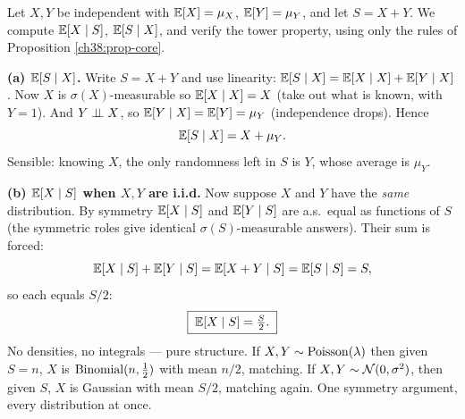 \begin{example}
\label{ch38:ex-sum}
Let $X, Y$ be independent with $\operatorname{\mathbb{E}}[X] = \mu_X$, $\operatorname{\mathbb{E}}[Y] = \mu_Y$, and let $S = X + Y$. We compute
$\operatorname{\mathbb{E}}[X \mid S]$, $\operatorname{\mathbb{E}}[S \mid X]$, and verify the tower property, using only the rules of
Proposition \ref{ch38:prop-core}.

\textbf{(a) $\operatorname{\mathbb{E}}[S\mid X]$.} Write $S = X + Y$ and use linearity: $\operatorname{\mathbb{E}}[S\mid X] = \operatorname{\mathbb{E}}[X\mid X] +
\operatorname{\mathbb{E}}[Y\mid X]$. Now $X$ is $\sigma(X)$-measurable so $\operatorname{\mathbb{E}}[X\mid X] = X$ (take out what is known, with
$Y=1$). And $Y \perp\!\!\!\perp X$, so $\operatorname{\mathbb{E}}[Y\mid X] = \operatorname{\mathbb{E}}[Y] = \mu_Y$ (independence drops). Hence
\[
  \operatorname{\mathbb{E}}[S\mid X] = X + \mu_Y.
\]
Sensible: knowing $X$, the only randomness left in $S$ is $Y$, whose average is $\mu_Y$.

\textbf{(b) $\operatorname{\mathbb{E}}[X\mid S]$ when $X, Y$ are i.i.d.} Now suppose $X$ and $Y$ have the \emph{same}
distribution. By symmetry $\operatorname{\mathbb{E}}[X\mid S]$ and $\operatorname{\mathbb{E}}[Y\mid S]$ are a.s.\ equal as functions of $S$ (the
symmetric roles give identical $\sigma(S)$-measurable answers). Their sum is forced:
\[
  \operatorname{\mathbb{E}}[X\mid S] + \operatorname{\mathbb{E}}[Y\mid S] = \operatorname{\mathbb{E}}[X + Y\mid S] = \operatorname{\mathbb{E}}[S\mid S] = S,
\]
so each equals $S/2$:
\[
  \boxed{\;\operatorname{\mathbb{E}}[X\mid S] = \tfrac{S}{2}.\;}
\]
No densities, no integrals --- pure structure. If $X,Y \sim \operatorname{Poisson}(\lambda)$ then given $S = n$, $X$ is
$\operatorname{Binomial}(n, \tfrac12)$ with mean $n/2$, matching. If $X,Y \sim \mathcal{N}(0,\sigma^2)$, then given $S$, $X$
is Gaussian with mean $S/2$, matching again. One symmetry argument, every distribution at once.

\begin{figure}[htbp]
\centering
{}
\end{figure}
\end{example}

